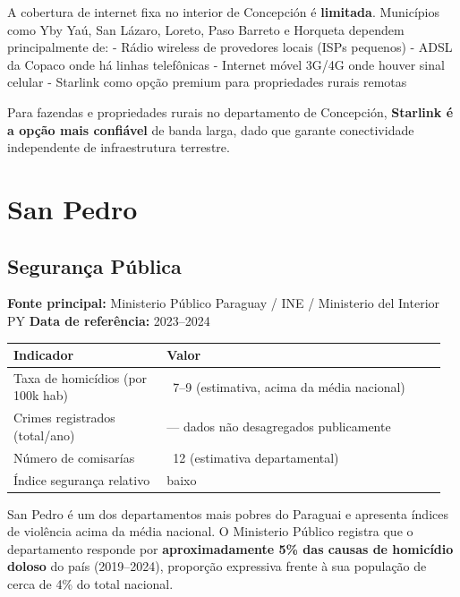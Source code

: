 A cobertura de internet fixa no interior de Concepción é \textbf{limitada}. Municípios como Yby Yaú, San Lázaro, Loreto, Paso Barreto e Horqueta dependem principalmente de:
- Rádio wireless de provedores locais (ISPs pequenos)
- ADSL da Copaco onde há linhas telefônicas
- Internet móvel 3G/4G onde houver sinal celular
- Starlink como opção premium para propriedades rurais remotas

Para fazendas e propriedades rurais no departamento de Concepción, \textbf{Starlink é a opção mais confiável} de banda larga, dado que garante conectividade independente de infraestrutura terrestre.





\clearpage
\section{San Pedro}
\label{sec:dept_02_San_Pedro}

\subsection{Segurança Pública}

\textbf{Fonte principal:} Ministerio Público Paraguay / INE / Ministerio del Interior PY
\textbf{Data de referência:} 2023--2024


{\small
\setlength{\tabcolsep}{3pt}
\renewcommand{\arraystretch}{1.12}
\begin{tabularx}{\linewidth}{>{\raggedright\arraybackslash}p{0.34\linewidth} >{\raggedright\arraybackslash}p{0.62\linewidth}}
\toprule
Indicador & Valor \\
\midrule
Taxa de homicídios (por 100k hab) & ~7--9 (estimativa, acima da média nacional) \\
Crimes registrados (total/ano) & --- dados não desagregados publicamente \\
Número de comisarías & ~12 (estimativa departamental) \\
Índice segurança relativo & baixo \\
\bottomrule
\end{tabularx}
}


San Pedro é um dos departamentos mais pobres do Paraguai e apresenta índices de violência acima da média nacional. O Ministerio Público registra que o departamento responde por \textbf{aproximadamente 5\% das causas de homicídio doloso} do país (2019--2024), proporção expressiva frente à sua população de cerca de 4\% do total nacional.

